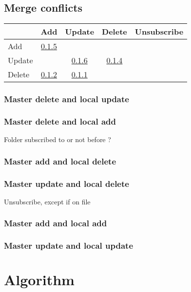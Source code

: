 \documentclass[10pt,a4paper]{article}
\begin{document}
\subsection{Merge conflicts}

\begin{tabular}{l|c c c c}
 & Add & Update & Delete & Unsubscribe \\
\hline
Add & \ref{addadd} &\\
Update & & \ref{updupd} & \ref{upddel} &\\
Delete & \ref{deladd} & \ref{delupd} & \\
\end{tabular}

\subsubsection{Master delete and local update}
\label{delupd}

\subsubsection{Master delete and local add}
\label{deladd}

Folder subscribed to or not before ?

\subsubsection{Master add and local delete}
\label{adddel}

\subsubsection{Master update and local delete}
\label{upddel}

Unsubscribe, except if on file

\subsubsection{Master add and local add}
\label{addadd}

\subsubsection{Master update and local update}
\label{updupd}

\section{Algorithm}
\end{document}
